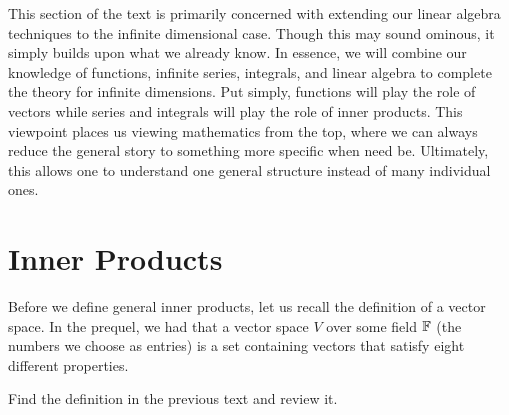 This section of the text is primarily concerned with extending our linear algebra techniques to the infinite dimensional case.  Though this may sound ominous, it simply builds upon what we already know.  In essence, we will combine our knowledge of functions, infinite series, integrals, and linear algebra to complete the theory for infinite dimensions.  Put simply, functions will play the role of vectors while series and integrals will play the role of inner products.  This viewpoint places us viewing mathematics from the top, where we can always reduce the general story to something more specific when need be. Ultimately, this allows one to understand one general structure instead of many individual ones.

\section{Inner Products}

Before we define general inner products, let us recall the definition of a vector space.  In the prequel, we had that a vector space $V$ over some field $\mathbb{F}$ (the numbers we choose as entries) is a set containing vectors that satisfy eight different properties.

\begin{exercise}
	Find the definition in the previous text and review it.
\end{exercise}

